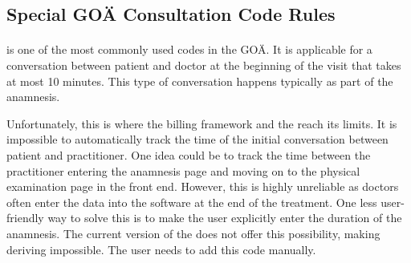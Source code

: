 %


\subsection{Special GOÄ Consultation Code Rules}\label{subsec:special-consultation-code-rules}

\paragraph{}\label{par:goa-1}
 is one of the most commonly used codes in the GOÄ.
It is applicable for a conversation between patient and doctor at the beginning of the visit that takes at most 10 minutes.
This type of conversation happens typically as part of the anamnesis.

Unfortunately, this is where the billing framework and the \AVS reach its limits.
It is impossible to automatically track the time of the initial conversation between patient and practitioner.
One idea could be to track the time between the practitioner entering the anamnesis page and moving on to the physical examination page in the front end.
However, this is highly unreliable as doctors often enter the data into the software at the end of the treatment.
One less user-friendly way to solve this is to make the user explicitly enter the duration of the anamnesis.
The current version of the \AVS does not offer this possibility, making deriving  impossible.
The user needs to add this code manually.

